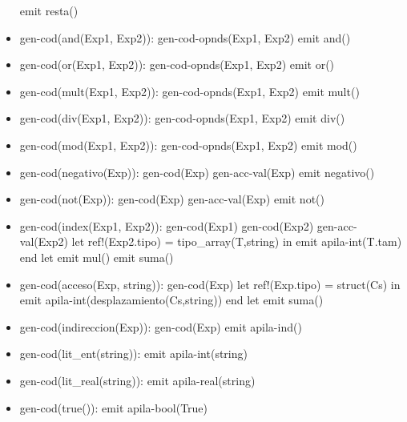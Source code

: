 \documentclass[11pt]{article}
\begin{document}
\begin{itemize}
                \subitem emit resta()
            \item gen-cod(and(Exp1, Exp2)): 
                \subitem gen-cod-opnds(Exp1, Exp2)
                \subitem emit and()
            \item gen-cod(or(Exp1, Exp2)): 
                \subitem gen-cod-opnds(Exp1, Exp2)
                \subitem emit or()
            \item gen-cod(mult(Exp1, Exp2)): 
                \subitem gen-cod-opnds(Exp1, Exp2)
                \subitem emit mult()
            \item gen-cod(div(Exp1, Exp2)): 
                \subitem gen-cod-opnds(Exp1, Exp2)
                \subitem emit div()
            \item gen-cod(mod(Exp1, Exp2)): 
                \subitem gen-cod-opnds(Exp1, Exp2)
                \subitem emit mod()
            \item gen-cod(negativo(Exp)): 
                \subitem gen-cod(Exp)
                \subitem gen-acc-val(Exp)
                \subitem emit negativo()
            \item gen-cod(not(Exp)): 
                \subitem gen-cod(Exp)
                \subitem gen-acc-val(Exp)
                \subitem emit not()
            \item gen-cod(index(Exp1, Exp2)): 
                \subitem gen-cod(Exp1)
                \subitem gen-cod(Exp2)
                \subitem gen-acc-val(Exp2)
                \subitem let ref!(Exp2.tipo) = tipo\_array(T,string) in
                    \subsubitem emit apila-int(T.tam)
                \subitem end let
                \subitem emit mul()
                \subitem emit suma()
            \item gen-cod(acceso(Exp, string)): 
                \subitem gen-cod(Exp)
                \subitem let ref!(Exp.tipo) = struct(Cs) in
                    \subsubitem emit apila-int(desplazamiento(Cs,string))
                \subitem end let
                \subitem emit suma()
            \item gen-cod(indireccion(Exp)): 
                \subitem gen-cod(Exp)
                \subitem emit apila-ind()
            \item gen-cod(lit\_ent(string)): 
                \subitem emit apila-int(string)
            \item gen-cod(lit\_real(string)): 
                \subitem emit apila-real(string)
            \item gen-cod(true()): 
                \subitem emit apila-bool(True)

\end{itemize}
\end{document}

